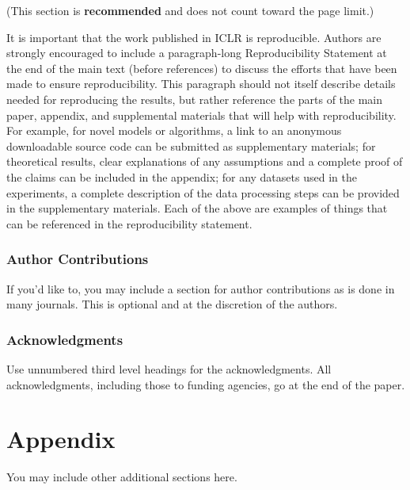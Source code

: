 \documentclass{article} %
\begin{document}
(This section is \textbf{recommended} and does not count toward the page limit.)

It is important that the work published in ICLR is reproducible. Authors are
strongly encouraged to include a paragraph-long Reproducibility Statement at the
end of the main text (before references) to discuss the efforts that have been
made to ensure reproducibility. This paragraph should not itself describe
details needed for reproducing the results, but rather reference the parts of
the main paper, appendix, and supplemental materials that will help with
reproducibility. For example, for novel models or algorithms, a link to an
anonymous downloadable source code can be submitted as supplementary materials;
for theoretical results, clear explanations of any assumptions and a complete
proof of the claims can be included in the appendix; for any datasets used in
the experiments, a complete description of the data processing steps can be
provided in the supplementary materials. Each of the above are examples of
things that can be referenced in the reproducibility statement.

\subsubsection*{Author Contributions}
If you'd like to, you may include  a section for author contributions as is done
in many journals. This is optional and at the discretion of the authors.

\subsubsection*{Acknowledgments}
Use unnumbered third level headings for the acknowledgments. All
acknowledgments, including those to funding agencies, go at the end of the paper.





\appendix
\section{Appendix}
You may include other additional sections here.
\end{document}
